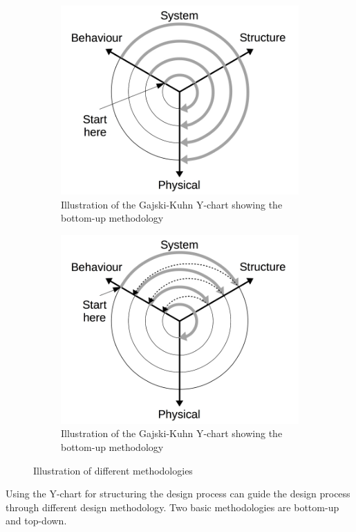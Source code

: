 \begin{figure}[ht]
  \centering
  \begin{subfigure}[t]{0.475\textwidth}
    \centering\includegraphics[width=\textwidth]{figures/bottom-up}
    \caption{Illustration of the Gajski-Kuhn Y-chart showing the bottom-up methodology \cite{gajski2009}  \label{fig:ybottom}}
  \end{subfigure}\hspace{0.5cm}
  \begin{subfigure}[t]{0.475\textwidth}
    \centering\includegraphics[width=\textwidth]{figures/top-down}
    \caption{Illustration of the Gajski-Kuhn Y-chart showing the bottom-up methodology \cite{gajski2009} \label{fig:ytop}}
  \end{subfigure}
  \caption{Illustration of different methodologies\label{fig:yboto}}
\end{figure}
Using the Y-chart for structuring the design process can guide the design process through different design methodology. Two basic methodologies are bottom-up and top-down. \\

